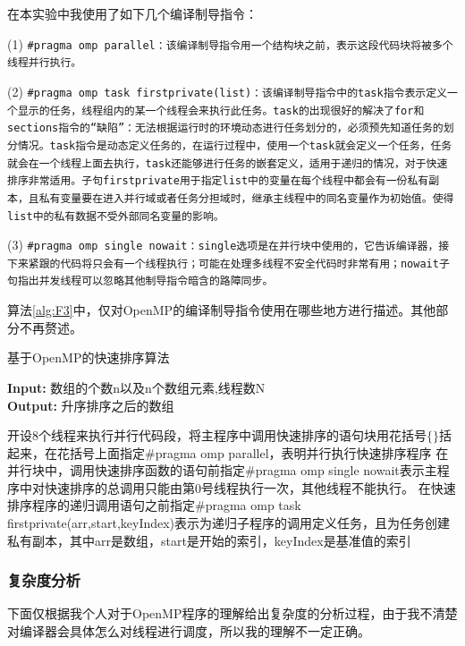 \documentclass[supercite]{Experimental_Report}
\theoremstyle{definition}
\begin{document}
在本实验中我使用了如下几个编译制导指令：

(1) \texttt{\#pragma omp parallel：该编译制导指令用一个结构块之前，表示这段代码块将被多个线程并行执行。}


(2) \texttt{\#pragma omp task firstprivate(list)：该编译制导指令中的task指令表示定义一个显示的任务，线程组内的某一个线程会来执行此任务。task的出现很好的解决了for和sections指令的“缺陷”：无法根据运行时的环境动态进行任务划分的，必须预先知道任务的划分情况。task指令是动态定义任务的，在运行过程中，使用一个task就会定义一个任务，任务就会在一个线程上面去执行，task还能够进行任务的嵌套定义，适用于递归的情况，对于快速排序非常适用。子句firstprivate用于指定list中的变量在每个线程中都会有一份私有副本，且私有变量要在进入并行域或者任务分担域时，继承主线程中的同名变量作为初始值。使得list中的私有数据不受外部同名变量的影响。}

(3) \texttt{\#pragma omp single nowait：single选项是在并行块中使用的，它告诉编译器，接下来紧跟的代码将只会有一个线程执行；可能在处理多线程不安全代码时非常有用；nowait子句指出并发线程可以忽略其他制导指令暗含的路障同步。}


算法\ref{alg:F3}中，仅对OpenMP的编译制导指令使用在哪些地方进行描述。其他部分不再赘述。
\begin{algorithm}[htb]
\caption{基于OpenMP的快速排序算法}
\label{alg:F3}
\hspace*{0.02in} {\bf Input:}
数组的个数n以及n个数组元素,线程数N\\
\hspace*{0.02in} {\bf Output:} 
升序排序之后的数组
  \begin{algorithmic}[1]
    \State
      开设8个线程来执行并行代码段，将主程序中调用快速排序的语句块用花括号$\{\}$括起来，在花括号上面指定\#pragma omp parallel，表明并行执行快速排序程序
    \State
      在并行块中，调用快速排序函数的语句前指定\#pragma omp single nowait表示主程序中对快速排序的总调用只能由第0号线程执行一次，其他线程不能执行。
    \State
      在快速排序程序的递归调用语句之前指定\#pragma omp task firstprivate(arr,start,keyIndex)表示为递归子程序的调用定义任务，且为任务创建私有副本，其中arr是数组，start是开始的索引，keyIndex是基准值的索引
  \end{algorithmic}
\end{algorithm}

\subsubsection{复杂度分析}
下面仅根据我个人对于OpenMP程序的理解给出复杂度的分析过程，由于我不清楚对编译器会具体怎么对线程进行调度，所以我的理解不一定正确。
\end{document}
